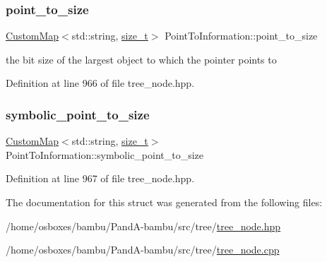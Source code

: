 \mbox{\label{structPointToInformation_a39949ca97d02f40be61a957b1ab3f864}} 
\subsubsection{\texorpdfstring{point\+\_\+to\+\_\+size}{point\_to\_size}}
{\footnotesize\ttfamily \hyperlink{custom__map_8hpp_a18ca01763abbe3e5623223bfe5aaac6b}{Custom\+Map}$<$std\+::string, \hyperlink{tutorial__fpt__2017_2intro_2sixth_2test_8c_a7c94ea6f8948649f8d181ae55911eeaf}{size\+\_\+t}$>$ Point\+To\+Information\+::point\+\_\+to\+\_\+size}



the bit size of the largest object to which the pointer points to 



Definition at line 966 of file tree\+\_\+node.\+hpp.

\mbox{\label{structPointToInformation_ad1ae56e5f06d9731849cb3664797de0b}} 
\subsubsection{\texorpdfstring{symbolic\+\_\+point\+\_\+to\+\_\+size}{symbolic\_point\_to\_size}}
{\footnotesize\ttfamily \hyperlink{custom__map_8hpp_a18ca01763abbe3e5623223bfe5aaac6b}{Custom\+Map}$<$std\+::string, \hyperlink{tutorial__fpt__2017_2intro_2sixth_2test_8c_a7c94ea6f8948649f8d181ae55911eeaf}{size\+\_\+t}$>$ Point\+To\+Information\+::symbolic\+\_\+point\+\_\+to\+\_\+size}



Definition at line 967 of file tree\+\_\+node.\+hpp.



The documentation for this struct was generated from the following files\+:\begin{DoxyCompactItemize}
\item 
/home/osboxes/bambu/\+Pand\+A-\/bambu/src/tree/\hyperlink{tree__node_8hpp}{tree\+\_\+node.\+hpp}\item 
/home/osboxes/bambu/\+Pand\+A-\/bambu/src/tree/\hyperlink{tree__node_8cpp}{tree\+\_\+node.\+cpp}\end{DoxyCompactItemize}
